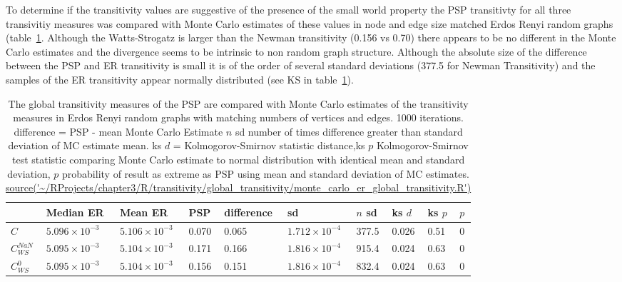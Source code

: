 To determine if the transitivity values are suggestive of the presence of the small world property the PSP transitivty for all three transivitiy measures was compared with Monte Carlo estimates of these values in node and edge size matched Erdos Renyi random graphs (table~\ref{tab:MC estimate of ER transitivity}. Although the Watts-Strogatz is larger than the Newman transitivity (0.156 vs 0.70) there appears to be no different in the Monte Carlo estimates and the divergence seems to be intrinsic to non random graph structure. Although the absolute size of the difference between the PSP and ER transitivity is small it is of the order of several standard deviations (377.5 for Newman Transitivity) and the samples of the ER transitivity appear normally distributed (see KS in table~\ref{tab:MC estimate of ER transitivity}).


\begin{table}[ht]
\centering
\begin{adjustbox}{width=\textwidth}
\begin{tabular}{llllllllll}
  \toprule
 & Median ER & Mean ER & PSP & difference & sd & $n$ sd & ks $d$ & ks $p$ & $p$ \\ 
  \midrule
$C$ & $5.096 \times 10^{-3}$ & $5.106 \times 10^{-3}$ & 0.070 & 0.065 & $1.712 \times 10^{-4}$ & 377.5 & 0.026 & 0.51 & 0 \vspace{1mm} \\ 
  $C_{WS}^{NaN}$ & $5.095 \times 10^{-3}$ & $5.104 \times 10^{-3}$ & 0.171 & 0.166 & $1.816 \times 10^{-4}$ & 915.4 & 0.024 & 0.63 & 0 \vspace{1mm} \\ 
  $C_{WS}^0$ & $5.095 \times 10^{-3}$ & $5.104 \times 10^{-3}$ & 0.156 & 0.151 & $1.816 \times 10^{-4}$ & 832.4 & 0.024 & 0.63 & 0 \vspace{1mm}\\ 
   \bottomrule
\end{tabular}
\end{adjustbox}
\caption[Global transitivity of PSP and Monte Carlo estimates - Erdos-Renyi]{The global transitivity measures of the PSP are compared with Monte Carlo estimates of the transitivity measures in Erdos Renyi random graphs with matching numbers of vertices and edges. 1000 iterations. difference  = PSP - mean Monte Carlo Estimate $n$ sd number of times difference greater than standard deviation of MC estimate mean. ks $d$ = Kolmogorov-Smirnov statistic distance,ks $p$ Kolmogorov-Smirnov test statistic comparing Monte Carlo estimate to normal distribution with identical mean and standard deviation,  $p$ probability of result as extreme as PSP using mean and standard deviation of MC estimates.  \url{source('~/RProjects/chapter3/R/transitivity/global_transitivity/monte_carlo_er_global_transitivity.R')}} 
\label{tab:MC estimate of ER transitivity}
\end{table}


